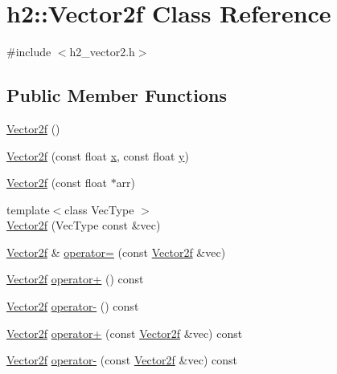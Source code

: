 \hypertarget{classh2_1_1_vector2f}{\section{h2\-:\-:Vector2f Class Reference}
\label{classh2_1_1_vector2f}
}


{\ttfamily \#include $<$h2\-\_\-vector2.\-h$>$}

\subsection*{Public Member Functions}
\begin{DoxyCompactItemize}
\item 
\hyperlink{classh2_1_1_vector2f_a03be150d62726e052a80904ce4c785d8}{Vector2f} ()
\item 
\hyperlink{classh2_1_1_vector2f_aec8acd7793b90c64077eded2d9e633b0}{Vector2f} (const float \hyperlink{classh2_1_1_vector2f_a39a782153c3a3b1bcec9803a609a96fb}{x}, const float \hyperlink{classh2_1_1_vector2f_ae38b4f697aa2273f1b5b4adf04ac949e}{y})
\item 
\hyperlink{classh2_1_1_vector2f_a3f2637d2bf79b07a4040067233cc148e}{Vector2f} (const float $\ast$arr)
\item 
{\footnotesize template$<$class Vec\-Type $>$ }\\\hyperlink{classh2_1_1_vector2f_afda46e7d6426ddd204c4386ddab71d45}{Vector2f} (Vec\-Type const \&vec)
\item 
\hyperlink{classh2_1_1_vector2f}{Vector2f} \& \hyperlink{classh2_1_1_vector2f_a1261d403c1495e6c96e98664c88c92cb}{operator=} (const \hyperlink{classh2_1_1_vector2f}{Vector2f} \&vec)
\item 
\hyperlink{classh2_1_1_vector2f}{Vector2f} \hyperlink{classh2_1_1_vector2f_a0fc8b8e3d43d36125e09fc787f958094}{operator+} () const 
\item 
\hyperlink{classh2_1_1_vector2f}{Vector2f} \hyperlink{classh2_1_1_vector2f_a986d4ffa310b4fa674cf49806aa93f75}{operator-\/} () const 
\item 
\hyperlink{classh2_1_1_vector2f}{Vector2f} \hyperlink{classh2_1_1_vector2f_af3910cc769ea596129a54a103f74cd94}{operator+} (const \hyperlink{classh2_1_1_vector2f}{Vector2f} \&vec) const 
\item 
\hyperlink{classh2_1_1_vector2f}{Vector2f} \hyperlink{classh2_1_1_vector2f_acfd3d2a80731fbb26c3613c05c77bc91}{operator-\/} (const \hyperlink{classh2_1_1_vector2f}{Vector2f} \&vec) const 
\item 

\end{DoxyCompactItemize}

